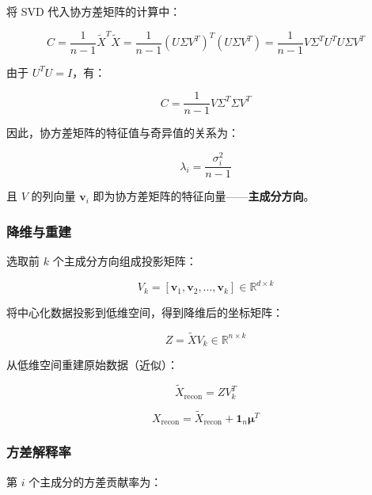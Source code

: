 \documentclass[a4paper]{article}
\begin{document}
将 SVD 代入协方差矩阵的计算中：

\begin{equation}
C = \frac{1}{n-1} \tilde{X}^T \tilde{X} = \frac{1}{n-1} (U \Sigma V^T)^T (U \Sigma V^T) = \frac{1}{n-1} V \Sigma^T U^T U \Sigma V^T
\end{equation}

由于 $U^T U = I$，有：

\begin{equation}
C = \frac{1}{n-1} V \Sigma^T \Sigma V^T
\end{equation}

因此，协方差矩阵的特征值与奇异值的关系为：

\begin{equation}
\lambda_i = \frac{\sigma_i^2}{n-1}
\end{equation}

且 $V$ 的列向量 $\mathbf{v}_i$ 即为协方差矩阵的特征向量——\textbf{主成分方向}。

\subsubsection{降维与重建}

选取前 $k$ 个主成分方向组成投影矩阵：

\begin{equation}
V_k = [\mathbf{v}_1, \mathbf{v}_2, \dots, \mathbf{v}_k] \in \mathbb{R}^{d \times k}
\end{equation}

将中心化数据投影到低维空间，得到降维后的坐标矩阵：

\begin{equation}
Z = \tilde{X} V_k \in \mathbb{R}^{n \times k}
\end{equation}

从低维空间重建原始数据（近似）：

\begin{equation}
\tilde{X}_{\text{recon}} = Z V_k^T
\end{equation}

\begin{equation}
X_{\text{recon}} = \tilde{X}_{\text{recon}} + \mathbf{1}_n \boldsymbol{\mu}^T
\end{equation}

\subsubsection{方差解释率}

第 $i$ 个主成分的方差贡献率为：
\end{document}
